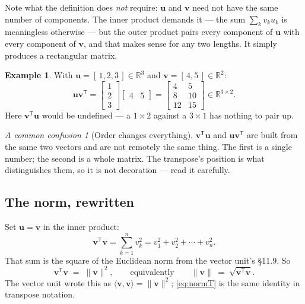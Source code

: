 \documentclass[11pt]{article}
\theoremstyle{plain}
\theoremstyle{definition}
\newtheorem{ex}{Example}[section]
\theoremstyle{remark}
\newtheorem*{warn}{A common confusion}
\newcommand{\R}{\mathbb{R}}
\newcommand{\vc}[1]{\mathbf{#1}}        %
\newcommand{\norm}[1]{\lVert #1\rVert}
\newcommand{\T}{^{\mathsf{T}}}          %
\begin{document}
\noindent Note what the definition does \emph{not} require: $\vc{u}$ and
$\vc{v}$ need not have the same number of components. The inner product demands
it --- the sum $\sum_k v_ku_k$ is meaningless otherwise --- but the outer product
pairs every component of $\vc{u}$ with every component of $\vc{v}$, and that
makes sense for any two lengths. It simply produces a rectangular matrix.

\begin{ex}
With $\vc{u}=[\,1,2,3\,]\in\R^{3}$ and $\vc{v}=[\,4,5\,]\in\R^{2}$:
\[
  \vc{u}\vc{v}\T
  =\begin{bmatrix}1\\2\\3\end{bmatrix}\begin{bmatrix}4&5\end{bmatrix}
  =\begin{bmatrix}4&5\\8&10\\12&15\end{bmatrix}\in\R^{3\times2} .
\]
Here $\vc{v}\T\vc{u}$ would be undefined --- a $1\times2$ against a $3\times1$
has nothing to pair up.
\end{ex}

\begin{warn}[Order changes everything]
$\vc{v}\T\vc{u}$ and $\vc{u}\vc{v}\T$ are built from the same two vectors and
are not remotely the same thing. The first is a single number; the second is a
whole matrix. The transpose's position is what distinguishes them, so it is not
decoration --- read it carefully.
\end{warn}

\subsection{The norm, rewritten}
Set $\vc{u}=\vc{v}$ in the inner product:
\[
  \vc{v}\T\vc{v} = \sum_{k=1}^{n} v_k^{2}
                 = v_1^{2}+v_2^{2}+\cdots+v_n^{2} .
\]
That sum is the square of the Euclidean norm from the vector unit's \S11.9. So
\begin{equation}\label{eq:normT}
  \vc{v}\T\vc{v} \;=\; \norm{\vc{v}}^{2},
  \qquad\text{equivalently}\qquad
  \norm{\vc{v}} \;=\; \sqrt{\vc{v}\T\vc{v}} .
\end{equation}
The vector unit wrote this as $\langle\vc{v},\vc{v}\rangle=\norm{\vc{v}}^{2}$;
\eqref{eq:normT} is the same identity in transpose notation.
\end{document}
